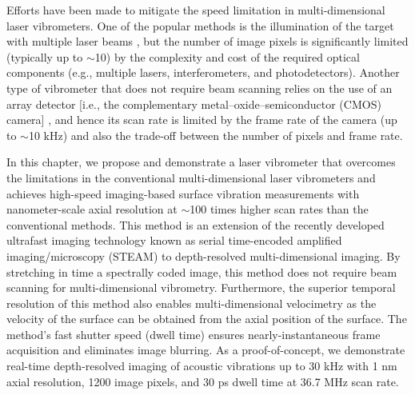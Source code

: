 Efforts have been made to mitigate the speed limitation in multi-dimensional laser vibrometers. One of the popular methods is the illumination of the target with multiple laser beams \cite{zheng1998multichannel,fu2010spatially}, but the number of image pixels is significantly limited (typically up to $\sim$10) \cite{zheng1998multichannel,fu2010spatially} by the complexity and cost of the required optical components (e.g., multiple lasers, interferometers, and photodetectors). Another type of vibrometer that does not require beam scanning relies on the use of an array detector [i.e., the complementary metal–oxide–semiconductor (CMOS) camera] \cite{popescu2006optical}, and hence its scan rate is limited by the frame rate of the camera (up to $\sim$10 kHz) \cite{popescu2006optical} and also the trade-off between the number of pixels and frame rate.

In this chapter, we propose and demonstrate a laser vibrometer that overcomes the limitations in the conventional multi-dimensional laser vibrometers and achieves high-speed imaging-based surface vibration measurements with nanometer-scale axial resolution at $\sim$100 times higher scan rates than the conventional methods. This method is an extension of the recently developed ultrafast imaging technology known as serial time-encoded amplified imaging/microscopy (STEAM) \cite{goda2009serial,goda2008amplified,qian2009real} to depth-resolved multi-dimensional imaging. By stretching in time a spectrally coded image, this method does not require beam scanning for multi-dimensional vibrometry. Furthermore, the superior temporal resolution of this method also enables multi-dimensional velocimetry as the velocity of the surface can be obtained from the axial position of the surface. The method’s fast shutter speed (dwell time) ensures nearly-instantaneous frame acquisition and eliminates image blurring. As a proof-of-concept, we demonstrate real-time depth-resolved imaging of acoustic vibrations up to 30 kHz with 1 nm axial resolution, 1200 image pixels, and 30 ps dwell time at 36.7 MHz scan rate.

